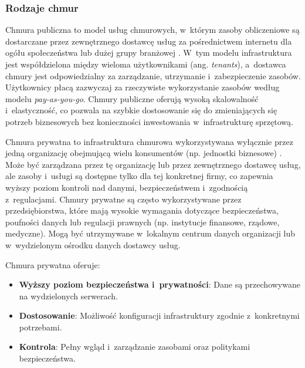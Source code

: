 \subsubsection{Rodzaje chmur}
\begin{description}[style=nextline, font=\bfseries]
    \item[Chmura publiczna]
          Chmura publiczna to model usług chmurowych, w~którym zasoby obliczeniowe są dostarczane przez zewnętrznego dostawcę usług za pośrednictwem internetu dla ogółu społeczeństwa lub dużej grupy branżowej \cite{Mell2011NISTCloudDefinition}.
          W~tym modelu infrastruktura jest współdzielona między wieloma użytkownikami (ang. \textit{tenants}), a~dostawca chmury jest odpowiedzialny za zarządzanie, utrzymanie i~zabezpieczenie zasobów.
          Użytkownicy płacą zazwyczaj za rzeczywiste wykorzystanie zasobów według modelu \textit{pay-as-you-go}.
          Chmury publiczne oferują wysoką skalowalność i~elastyczność, co pozwala na szybkie dostosowanie się do zmieniających się potrzeb biznesowych bez konieczności inwestowania w~infrastrukturę sprzętową.

    \item[Chmura prywatna]
          Chmura prywatna to infrastruktura chmurowa wykorzystywana wyłącznie przez jedną organizację obejmującą wielu konsumentów (np. jednostki biznesowe) \cite{Mell2011NISTCloudDefinition}.
          Może być zarządzana przez tę organizację lub przez zewnętrznego dostawcę usług, ale zasoby i~usługi są dostępne tylko dla tej konkretnej firmy, co zapewnia wyższy poziom kontroli nad danymi, bezpieczeństwem i~zgodnością z~regulacjami.
          Chmury prywatne są często wykorzystywane przez przedsiębiorstwa, które mają wysokie wymagania dotyczące bezpieczeństwa, poufności danych lub regulacji prawnych (np. instytucje finansowe, rządowe, medyczne).
          Mogą być utrzymywane w~lokalnym centrum danych organizacji lub w~wydzielonym ośrodku danych dostawcy usług.

          Chmura prywatna oferuje:
          \begin{itemize}[leftmargin=*]
              \item \textbf{Wyższy poziom bezpieczeństwa i~prywatności}: Dane są przechowywane na wydzielonych serwerach.
              \item \textbf{Dostosowanie}: Możliwość konfiguracji infrastruktury zgodnie z~konkretnymi potrzebami.
              \item \textbf{Kontrola}: Pełny wgląd i~zarządzanie zasobami oraz politykami bezpieczeństwa.
          \end{itemize}


\end{description}
